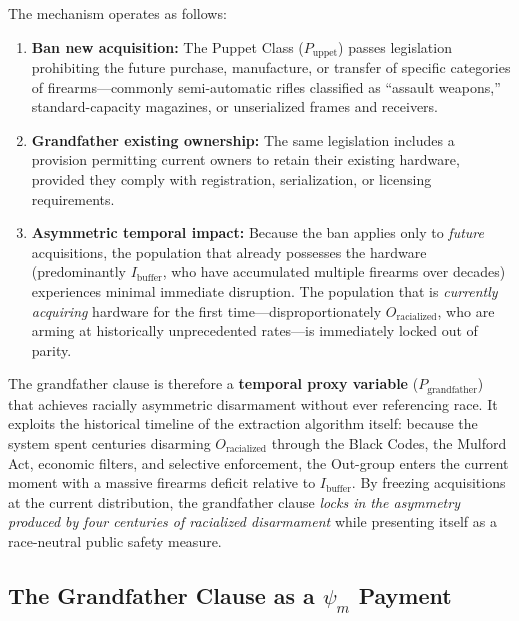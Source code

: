 The mechanism operates as follows:

\begin{enumerate}
    \item \textbf{Ban new acquisition:} The Puppet Class ($P_{\text{uppet}}$) passes legislation prohibiting the future purchase, manufacture, or transfer of specific categories of firearms---commonly semi-automatic rifles classified as ``assault weapons,'' standard-capacity magazines, or unserialized frames and receivers.

    \item \textbf{Grandfather existing ownership:} The same legislation includes a provision permitting current owners to retain their existing hardware, provided they comply with registration, serialization, or licensing requirements.

    \item \textbf{Asymmetric temporal impact:} Because the ban applies only to \textit{future} acquisitions, the population that already possesses the hardware (predominantly $I_{\text{buffer}}$, who have accumulated multiple firearms over decades) experiences minimal immediate disruption. The population that is \textit{currently acquiring} hardware for the first time---disproportionately $O_{\text{racialized}}$, who are arming at historically unprecedented rates---is immediately locked out of parity.
\end{enumerate}

The grandfather clause is therefore a \textbf{temporal proxy variable} ($P_{\text{grandfather}}$) that achieves racially asymmetric disarmament without ever referencing race. It exploits the historical timeline of the extraction algorithm itself: because the system spent centuries disarming $O_{\text{racialized}}$ through the Black Codes, the Mulford Act, economic filters, and selective enforcement, the Out-group enters the current moment with a massive firearms deficit relative to $I_{\text{buffer}}$. By freezing acquisitions at the current distribution, the grandfather clause \textit{locks in the asymmetry produced by four centuries of racialized disarmament} while presenting itself as a race-neutral public safety measure.

\subsection{The Grandfather Clause as a $\psi_m$ Payment}

